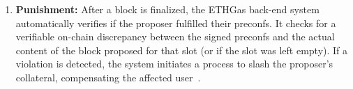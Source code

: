 \documentclass[a4paper]{article}
\theoremstyle{boldstyle}
\begin{document}
\begin{enumerate}
            \item \textbf{Punishment:}  
            After a block is finalized, the ETHGas back-end system automatically verifies if the proposer fulfilled their preconfs. It checks for a verifiable on-chain discrepancy between the signed preconfs and the actual content of the block proposed for that slot (or if the slot was left empty). If a violation is detected, the system initiates a process to slash the proposer's collateral, compensating the affected user~\cite{W:ETHGasDocs-Validators}.
            
        \end{enumerate}


        
        

        

        
          
        
\end{document}
